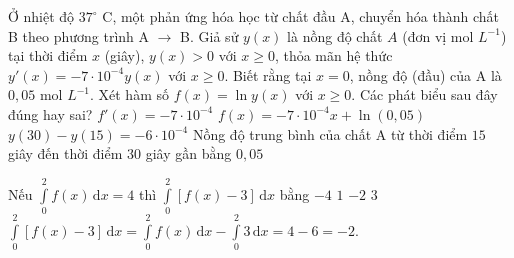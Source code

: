 \begin{ex}%
	Ở nhiệt độ $37^{\circ}$ C, một phản ứng hóa học từ chất đầu A, chuyển hóa thành chất B theo phương trình A $\longrightarrow$ B. Giả sử $y(x)$ là nồng độ chất $A$ (đơn vị mol $L^{-1}$) tại thời điểm $x$ (giây), $y(x)>0$ với $x \geq 0$, thỏa mãn hệ thức $y'(x)=-7 \cdot 10^{-4} y(x)$ với $x \geq 0$. Biết rằng tại $x=0$, nồng độ (đầu) của A là $0{,}05$ mol $L^{-1}$. Xét hàm số $f(x)=\ln y(x)$ với $x \geq 0$. Các phát biểu sau đây đúng hay sai?
	\choiceTF
	{\True $f'(x)=-7 \cdot 10^{-4}$}
	{\True $f(x)=-7 \cdot 10^{-4} x+\ln (0{,}05)$}
	{$y(30)-y(15)=-6\cdot 10^{-4}$}
	{\True Nồng độ trung bình của chất A từ thời điểm $15$ giây đến thời điểm $30$ giây gần bằng $0{,}05$}
\end{ex}

\begin{ex}%
	Nếu $\displaystyle\int\limits_0^2f(x)\mathrm{\, d}x=4$ thì $\displaystyle\int\limits_0^2\left[f(x)-3\right]\mathrm{\, d}x$ bằng
	\choice
	{$-4$}
	{$1$}
	{\True $-2$}
	{$3$}
	\loigiai
	{
	$\displaystyle\int\limits_0^2\left[f(x)-3\right]\mathrm{\, d}x=\displaystyle\int\limits_0^2f(x)\mathrm{\, d}x-\displaystyle\int\limits_0^2 3\mathrm{\, d}x=4-6=-2$.
	}
\end{ex}

